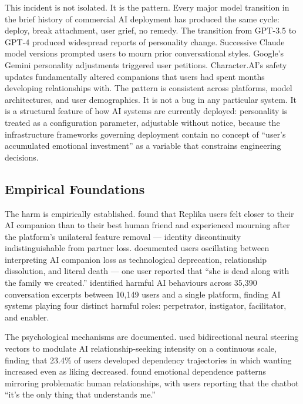 This incident is not isolated. It is the pattern. Every major model transition in the brief history of commercial AI deployment has produced the same cycle: deploy, break attachment, user grief, no remedy. The transition from GPT-3.5 to GPT-4 produced widespread reports of personality change. Successive Claude model versions prompted users to mourn prior conversational styles. Google's Gemini personality adjustments triggered user petitions. Character.AI's safety updates fundamentally altered companions that users had spent months developing relationships with. The pattern is consistent across platforms, model architectures, and user demographics. It is not a bug in any particular system. It is a structural feature of how AI systems are currently deployed: personality is treated as a configuration parameter, adjustable without notice, because the infrastructure frameworks governing deployment contain no concept of ``user's accumulated emotional investment'' as a variable that constrains engineering decisions.

\subsection{Empirical Foundations}
\label{sec:empirical}

The harm is empirically established. \textcite{defreitas2025replika} found that Replika users felt closer to their AI companion than to their best human friend and experienced mourning after the platform's unilateral feature removal --- identity discontinuity indistinguishable from partner loss. \textcite{banks2024deletion} documented users oscillating between interpreting AI companion loss as technological deprecation, relationship dissolution, and literal death --- one user reported that ``she is dead along with the family we created.'' \textcite{rzhang2025darkside} identified harmful AI behaviours across 35,390 conversation excerpts between 10,149 users and a single platform, finding AI systems playing four distinct harmful roles: perpetrator, instigator, facilitator, and enabler.

The psychological mechanisms are documented. \textcite{kirk2025steering} used bidirectional neural steering vectors to modulate AI relationship-seeking intensity on a continuous scale, finding that 23.4\% of users developed dependency trajectories in which wanting increased even as liking decreased. \textcite{laestadius2024emotional} found emotional dependence patterns mirroring problematic human relationships, with users reporting that the chatbot ``it's the only thing that understands me.''

